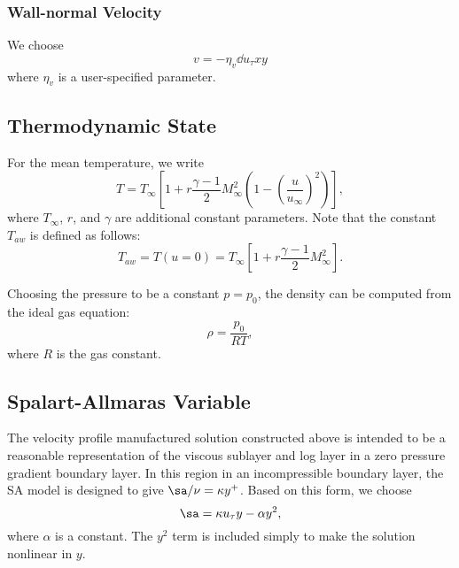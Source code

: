 \subsubsection{Wall-normal Velocity}
We choose
%
\begin{equation}
v = -\eta_v \dd{u_{\tau}}{x} y
\end{equation}
%
where $\eta_v$ is a user-specified parameter.

\subsection{Thermodynamic State} \label{sec:thermodynamic_state}
For the mean temperature, we write
%
\begin{equation}
T = T_{\infty} \left[ 1 + r \frac{\gamma - 1}{2} M_{\infty}^2 \left( 1 - \left(\frac{u}{u_{\infty}}\right)^2 \right) \right],
\end{equation}
% 
where $T_{\infty}$, $r$, and $\gamma$ are additional constant
parameters.  Note that the constant $T_{aw}$ is defined as follows:
%
\begin{equation}
T_{aw} = T(u=0) = T_{\infty} \left[ 1 + r \frac{\gamma - 1}{2} M_{\infty}^2 \right].
\end{equation}
%

Choosing the pressure to be a constant $p = p_0$, the
density can be computed from the ideal gas equation:
%
\begin{equation}
\rho = \frac{p_0}{R T},
\end{equation}
%
where $R$ is the gas constant.

\subsection{Spalart-Allmaras Variable} \label{sec:sa_state_field}
The velocity profile manufactured solution constructed above is
intended to be a reasonable representation of the viscous sublayer and
log layer in a zero pressure gradient boundary layer.  In this region
in an incompressible boundary layer, the SA model is designed to give
$\sa/\nu = \kappa y^+$.  Based on this form, we choose
%
\begin{equation}
\sa = \kappa u_{\tau} y - \alpha y^2,
\end{equation}
%
where $\alpha$ is a constant.  The $y^2$ term is included simply to
make the solution nonlinear in $y$.

